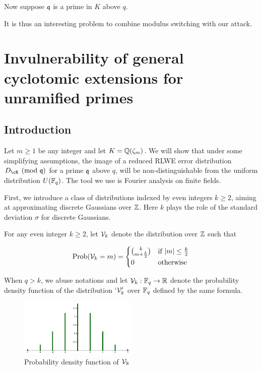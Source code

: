 \documentclass{amsart}
\begin{document}
Now suppose $\mathfrak{q}$ is a prime in $K$ above $q$.





It is thus an interesting problem to combine modulus switching with our attack.

\section{Invulnerability of general cyclotomic extensions for unramified primes}
\label{sec: cyclo-secure}

\subsection{Introduction}

Let $m \geq 1$ be any integer and let $K = \mathbb{Q}(\zeta_m)$. We will show that under some simplifying assumptions, the image of a reduced RLWE error distribution $D_\cR \pmod{\fq}$ for a prime $\mathfrak{q}$ above $q$, will be non-distinguishable from the uniform distribution $U(\mathbb{F}_q)$. The tool we use is Fourier analysis on finite fields.

First, we introduce a class of distributions indexed by even integers $k \geq 2$, aiming at approximating discrete Gaussians over $\mathbb{Z}$. Here $k$ plays the role of
the standard deviation $\sigma$ for discrete Gaussians.
\begin{Definition}
For any even integer $k \geq 2$, let $\mathcal{V}_k$ denote the distribution over $\mathbb{Z}$ such that

$$\operatorname{Prob}(\mathcal{V}_k = m) =  \begin{cases} {k}\choose{m+\frac{k}{2}} &\mbox{if } |m| \leq \frac{k}{2} \\
0 & \mbox{otherwise}  \end{cases}$$

\end{Definition}
When $q > k$, we abuse notations and let $\mathcal{V}_k: \mathbb{F}_q \to \mathbb{R}$ denote the probability density function of the distribution $`\mathcal{V}_k'$ over $\mathbb{F}_q$ defined by the same formula.

\begin{figure}[h!]
\centering
\includegraphics[width = 0.5\textwidth]{v8.png}
\caption{Probability density function of $\mathcal{V}_8$}
\end{figure}
\end{document}
